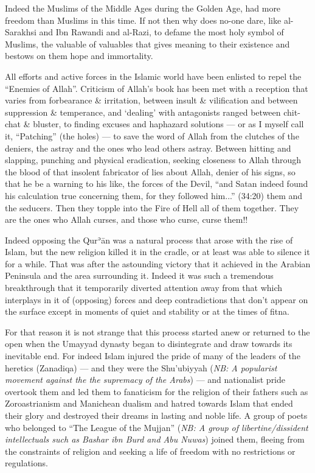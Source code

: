 \documentclass[12pt]{book}
\def \Quran{Qurʾān} %
\def \Qrn{\Quran}   %
\newcommand{\NB}[1]{\emph{\small NB: #1}}
\begin{document}
Indeed the Muslims of the Middle Ages during the Golden Age, had more freedom
than Muslims in this time. If not then why does no-one dare, like al-Sarakhsi
and Ibn Rawandi and al-Razi, to defame the most holy symbol of Muslims, the
valuable of valuables that gives meaning to their existence and bestows on them
hope and immortality.

All efforts and active forces in the Islamic world have been enlisted to repel
the “Enemies of Allah”. Criticism of Allah’s book has been met with a reception
that varies from forbearance \& irritation, between insult \& vilification and
between suppression \& temperance, and ‘dealing’ with antagonists ranged
between chit-chat \& bluster,
to finding excuses and haphazard solutions — or as
I myself call it, “Patching” (the holes) — to save the word of Allah from the
clutches of the deniers, the astray and the ones who lead others astray.
Between hitting and slapping, punching and physical eradication, seeking
closeness to Allah through the blood of that insolent fabricator of lies about
Allah, denier of his signs, so that he be a warning to his like, the forces of
the Devil, “and Satan indeed found his calculation true concerning them, for
they followed him...” (34:20) them and the seducers. Then they topple into the
Fire of Hell all of them together\footnotemark. They are the ones who Allah
curses, and those who curse, curse them!!


Indeed opposing the \Qrn{} was a natural process that arose with the rise of
Islam, but the new religion killed it in the cradle, or at least was able to
silence it for a while. That was after the astounding victory that it achieved
in the Arabian Peninsula and the area surrounding it. Indeed it was such a
tremendous breakthrough that it temporarily diverted attention away from that
which interplays in it of (opposing) forces and deep contradictions that don’t
appear on the surface except in moments of quiet and stability or at the times
of fitna.

For that reason it is not strange that this process started anew or returned to
the open when the Umayyad dynasty began to disintegrate and draw towards its
inevitable end. For indeed Islam injured the pride of many of the leaders of
the heretics (Zanadiqa) — and they were the Shu’ubiyyah
(\NB{A popularist movement against the the supremacy of the Arabs})
— and nationalist pride overtook them and led them to fanaticism for the
religion of their fathers such as Zoroastrianism and Manichean dualism and
hatred towards Islam that ended their glory and destroyed their dreams in
lasting and noble life. A group of poets who belonged to “The League of the
Mujjan”
(\NB{A group of libertine/dissident intellectuals such as Bashar ibn Burd and
Abu Nuwas})
joined them, fleeing from the constraints of religion
and seeking a life of freedom with no restrictions or regulations.
\end{document}
